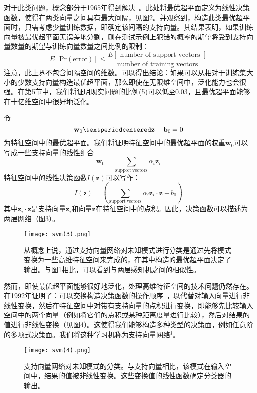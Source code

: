 \documentclass[lang=cn,11pt,a4paper]{elegantpaper}
\newcommand{\upcite}[1]{\textsuperscript{\textsuperscript{\cite{#1}}}}
\begin{document}
	对于此类问题，概念部分于1965年得到解决~\upcite{vapnik1982estimation}。此处将最优超平面定义为线性决策函数，使得在两类向量之间具有最大间隔，见图2。并观察到，构造此类最优超平面时，只需考虑少量训练数据，即确定该间隔的支持向量。其结果表明，如果训练向量被最优超平面无误差地分割，则在测试示例上犯错的概率的期望将受到支持向量数量的期望与训练向量数量之间比例的限制：
	\begin{equation}
		E[\mathrm{Pr}(\mathrm{error})] \leq \frac{E[\text { number of support vectors }]}{\text { number of training vectors }}\tag{5}
	\end{equation}
	注意，此上界不包含间隔空间的维数。可以得出结论：如果可以从相对于训练集大小的少数支持向量构造最优超平面，那么即使在无限维空间中，泛化能力也会很强。在第5节中，我们将证明现实问题的比例(5)可以低至$0.03$，且最优超平面能够在十亿维空间中很好地泛化。

	令
	\begin{equation}
		\mathbf{w}_0·\mathbf{z}+\mathbf{b}_0 =0\notag
	\end{equation}
	为特征空间中的最优超平面。我们将证明特征空间中的最优超平面的权重$\mathbf{w}_0$可以写成一些支持向量的线性组合
	\begin{equation}
		\mathbf{w}_0=\sum_\mathrm{support\ vectors}\alpha_i\mathbf{z}_i\tag{6}
	\end{equation}
	特征空间中的线性决策函数$I(\mathbf{z})$可以写作：
	\begin{equation}
		I(\mathbf{z})=\left(\sum_\mathrm{support\ vectors}\alpha_i\mathbf{z}_i·\mathbf{z}+b_0\right)\tag{7}
	\end{equation}
	其中$\mathbf{z}_i·\mathbf{z}$是支持向量$\mathbf{z}_i$和向量$\mathbf{z}$在特征空间中的点积。因此，决策函数可以描述为两层网络（图3）。
	\begin{figure}[htbp]
		\centering
		\texttt{[image: svm(3).png]}
		\caption{从概念上说，通过支持向量网络对未知模式进行分类是通过先将模式变换为一些高维特征空间来完成的，在其中构造的最优超平面决定了输出。与图1相比，可以看到与两层感知机之间的相似性。}
	\end{figure}

	然而，即使最优超平面能够很好地泛化，处理高维特征空间的技术问题仍然存在。
	在1992年证明了：可以交换构造决策函数的操作顺序~\upcite{boser1992training}，以代替对输入向量进行非线性变换，然后在特征空间中对带有支持向量的点积进行变换，即能够先比较输入空间中的两个向量（例如将它们的点积或某种距离度量进行比较），然后对结果的值进行非线性变换（见图4）。这使得我们能够构造多种类型的决策面，例如任意阶的多项式决策面。我们将这种学习机称为支持向量网络$^3$。
	\begin{figure}[htbp]
		\centering
		\texttt{[image: svm(4).png]}
		\caption{支持向量网络对未知模式的分类。与支持向量相比，该模式在输入空间中，结果的值被非线性变换。这些变换值的线性函数确定分类器的输出。}
	\end{figure}
\end{document}
